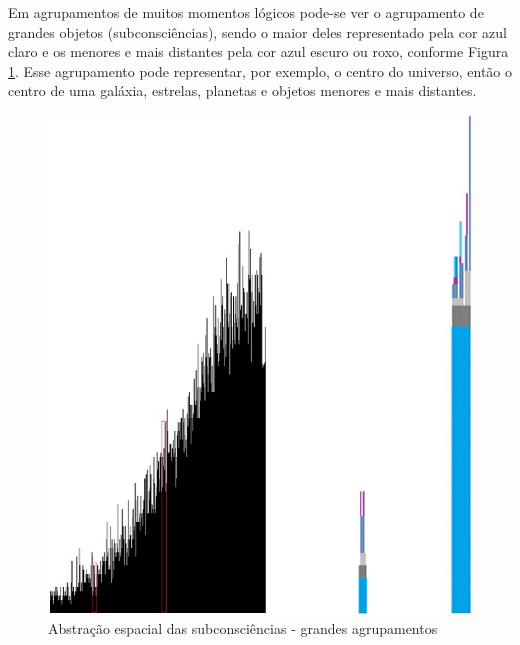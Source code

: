 Em agrupamentos de muitos momentos lógicos pode-se ver o agrupamento de grandes objetos (subconsciências), sendo o maior deles representado pela cor azul claro e os menores e mais distantes pela cor azul escuro ou roxo, conforme Figura \ref{fig:consciousness_space_subconsciousness}. Esse agrupamento pode representar, por exemplo, o centro do universo, então o centro de uma galáxia, estrelas, planetas e objetos menores e mais distantes.
	\begin{figure}[H]
	\caption{Abstração espacial das subconsciências - grandes agrupamentos}
	\label{fig:consciousness_space_subconsciousness}
	\centering
	\includegraphics[scale=.5]{sections/images/consciousness_space_subconsciousness.jpg}
	\end{figure}


